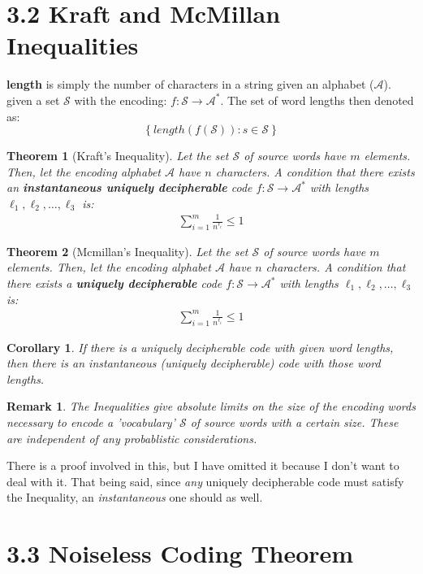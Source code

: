 \documentclass[a4paper, 11pt]{article}
\newtheorem{theorem}{Theorem}
\newtheorem*{corollary}{Corollary}
\newtheorem*{remark}{Remark}
\begin{document}
\section*{3.2 Kraft and McMillan Inequalities}
    \indent{} \textbf{length} is simply the number of characters in a string given an alphabet ($\mathcal{A}$).
    given a set $\mathcal{S}$ with the encoding: $f:\mathcal{S}\rightarrow \mathcal{A}^*$. The set of word lengths then denoted as:
    \[\left\{length(f(\mathcal{S})) : s \in \mathcal{S}\right\}\]

    \vspace{3mm}

\begin{theorem}[Kraft's Inequality]
    Let the set $\mathcal{S}$ of source words have $m$ elements. Then, let the encoding alphabet $\mathcal{A}$ have $n$ characters.
    A condition that there exists an \textbf{instantaneous uniquely decipherable} code $f:\mathcal{S} \rightarrow \mathcal{A}^*$ with lengths
    $\ell_1, \ell_2, \dots, \ell_3$ is:
    \begin{align}
        \sum_{i=1}^{m} \frac{1}{n^{\ell_i}} \leq 1
    \end{align}
\end{theorem}

\begin{theorem}[Mcmillan's Inequality]
    Let the set $\mathcal{S}$ of source words have $m$ elements. Then, let the encoding alphabet $\mathcal{A}$ have $n$ characters.
    A condition that there exists a \textbf{uniquely decipherable} code $f:\mathcal{S} \rightarrow \mathcal{A}^*$ with lengths
    $\ell_1, \ell_2, \dots, \ell_3$ is:
    \begin{align}
        \sum_{i=1}^{m} \frac{1}{n^{\ell_i}} \leq 1
    \end{align}
\end{theorem}

\begin{corollary}
    If there is a uniquely decipherable code with given word lengths, then there is an \emph{instantaneous} (uniquely decipherable) code with those word lengths.
\end{corollary}

\begin{remark}
    The Inequalities give absolute limits on the size of the encoding words necessary to encode a 'vocabulary' $\mathcal{S}$ of source words with a certain size. These are independent of any probablistic considerations.
\end{remark}

\indent{} There is a proof involved in this, but I have omitted it because I don't want to deal with it. That being said, since \emph{any} uniquely decipherable code must satisfy the Inequality, an \emph{instantaneous} one should as well.

\section*{3.3 Noiseless Coding Theorem}
\end{document}

